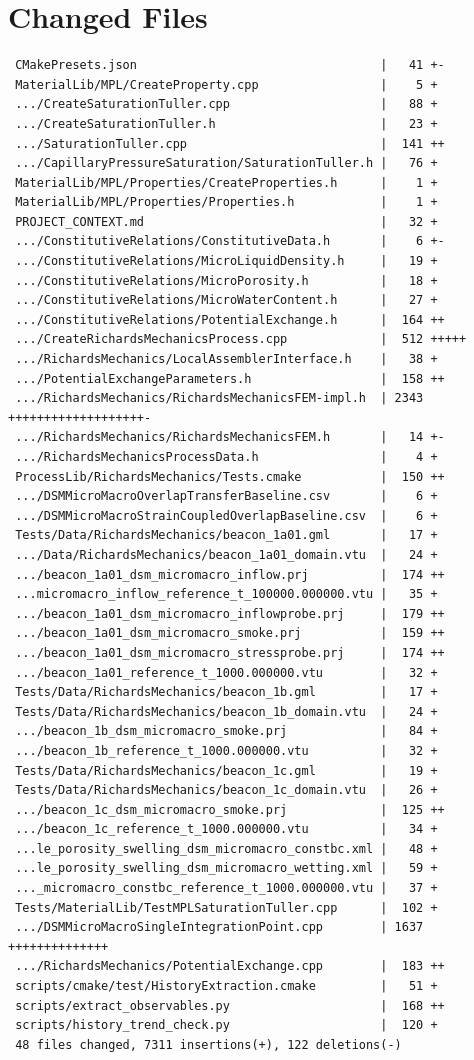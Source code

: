 \documentclass[10pt]{article}
\begin{document}
\section*{Changed Files}
\begin{lstlisting}
 CMakePresets.json                                  |   41 +-
 MaterialLib/MPL/CreateProperty.cpp                 |    5 +
 .../CreateSaturationTuller.cpp                     |   88 +
 .../CreateSaturationTuller.h                       |   23 +
 .../SaturationTuller.cpp                           |  141 ++
 .../CapillaryPressureSaturation/SaturationTuller.h |   76 +
 MaterialLib/MPL/Properties/CreateProperties.h      |    1 +
 MaterialLib/MPL/Properties/Properties.h            |    1 +
 PROJECT_CONTEXT.md                                 |   32 +
 .../ConstitutiveRelations/ConstitutiveData.h       |    6 +-
 .../ConstitutiveRelations/MicroLiquidDensity.h     |   19 +
 .../ConstitutiveRelations/MicroPorosity.h          |   18 +
 .../ConstitutiveRelations/MicroWaterContent.h      |   27 +
 .../ConstitutiveRelations/PotentialExchange.h      |  164 ++
 .../CreateRichardsMechanicsProcess.cpp             |  512 +++++
 .../RichardsMechanics/LocalAssemblerInterface.h    |   38 +
 .../PotentialExchangeParameters.h                  |  158 ++
 .../RichardsMechanics/RichardsMechanicsFEM-impl.h  | 2343 +++++++++++++++++++-
 .../RichardsMechanics/RichardsMechanicsFEM.h       |   14 +-
 .../RichardsMechanicsProcessData.h                 |    4 +
 ProcessLib/RichardsMechanics/Tests.cmake           |  150 ++
 .../DSMMicroMacroOverlapTransferBaseline.csv       |    6 +
 .../DSMMicroMacroStrainCoupledOverlapBaseline.csv  |    6 +
 Tests/Data/RichardsMechanics/beacon_1a01.gml       |   17 +
 .../Data/RichardsMechanics/beacon_1a01_domain.vtu  |   24 +
 .../beacon_1a01_dsm_micromacro_inflow.prj          |  174 ++
 ...micromacro_inflow_reference_t_100000.000000.vtu |   35 +
 .../beacon_1a01_dsm_micromacro_inflowprobe.prj     |  179 ++
 .../beacon_1a01_dsm_micromacro_smoke.prj           |  159 ++
 .../beacon_1a01_dsm_micromacro_stressprobe.prj     |  174 ++
 .../beacon_1a01_reference_t_1000.000000.vtu        |   32 +
 Tests/Data/RichardsMechanics/beacon_1b.gml         |   17 +
 Tests/Data/RichardsMechanics/beacon_1b_domain.vtu  |   24 +
 .../beacon_1b_dsm_micromacro_smoke.prj             |   84 +
 .../beacon_1b_reference_t_1000.000000.vtu          |   32 +
 Tests/Data/RichardsMechanics/beacon_1c.gml         |   19 +
 Tests/Data/RichardsMechanics/beacon_1c_domain.vtu  |   26 +
 .../beacon_1c_dsm_micromacro_smoke.prj             |  125 ++
 .../beacon_1c_reference_t_1000.000000.vtu          |   34 +
 ...le_porosity_swelling_dsm_micromacro_constbc.xml |   48 +
 ...le_porosity_swelling_dsm_micromacro_wetting.xml |   59 +
 ..._micromacro_constbc_reference_t_1000.000000.vtu |   37 +
 Tests/MaterialLib/TestMPLSaturationTuller.cpp      |  102 +
 .../DSMMicroMacroSingleIntegrationPoint.cpp        | 1637 ++++++++++++++
 .../RichardsMechanics/PotentialExchange.cpp        |  183 ++
 scripts/cmake/test/HistoryExtraction.cmake         |   51 +
 scripts/extract_observables.py                     |  168 ++
 scripts/history_trend_check.py                     |  120 +
 48 files changed, 7311 insertions(+), 122 deletions(-)
\end{lstlisting}
\end{document}
